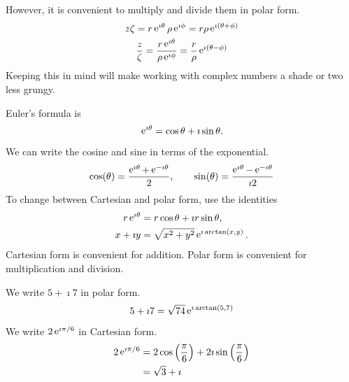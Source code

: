 However, it is convenient to multiply and divide them in polar form.
\begin{gather*}
  z \zeta
  = r \mathop{\mathrm{e}}\nolimits^{\imath \theta} \rho \mathop{\mathrm{e}}\nolimits^{\imath \phi} = r \rho \mathop{\mathrm{e}}\nolimits^{\imath \left( \theta + \phi \right)}
  \\
  \frac{z}{\zeta}
  = \frac{r \mathop{\mathrm{e}}\nolimits^{\imath \theta}}{\rho \mathop{\mathrm{e}}\nolimits^{\imath \phi}}
  = \frac{r}{\rho} \mathop{\mathrm{e}}\nolimits^{\imath \left( \theta - \phi \right)}
\end{gather*}
Keeping this in mind will make working with complex numbers a shade or 
two less grungy.






\begin{Result}
  \label{cartesian_and_polar_form}
  Euler's formula is 
  \[
  \mathop{\mathrm{e}}\nolimits^{\imath \theta} = \cos \theta + \imath \sin \theta.
  \]
  We can write the cosine and sine in terms of the exponential.
  \[
  \cos(\theta) = \frac{\mathop{\mathrm{e}}\nolimits^{\imath \theta} + \mathop{\mathrm{e}}\nolimits^{-\imath \theta}}{2}, 
  \qquad
  \sin(\theta) = \frac{\mathop{\mathrm{e}}\nolimits^{\imath \theta} - \mathop{\mathrm{e}}\nolimits^{-\imath \theta}}{\imath 2}
  \]
  To change between Cartesian and polar form, use the identities
  \begin{align*}
    r \mathop{\mathrm{e}}\nolimits^{\imath \theta} &= r \cos \theta + \imath r \sin \theta, 
    \\
    x + \imath y &= \sqrt{x^2 + y^2} \mathop{\mathrm{e}}\nolimits^{\imath \arctan(x,y)}.
  \end{align*}
  Cartesian form is convenient for addition.  Polar form is convenient 
  for multiplication and division.
\end{Result}







\begin{Example}
  We write $5 + \imath 7$ in polar form.
  \[
  5 + \imath 7 = \sqrt{74} \mathop{\mathrm{e}}\nolimits^{\imath \arctan(5,7) }
  \]
  We write $2 \mathop{\mathrm{e}}\nolimits^{\imath \pi / 6}$ in Cartesian form.
  \begin{align*}
    2 \mathop{\mathrm{e}}\nolimits^{\imath \pi / 6} 
    &= 2 \cos \left( \frac{\pi}{6} \right) 
    + 2 \imath \sin \left( \frac{\pi}{6} \right) 
    \\
    &= \sqrt{3} + \imath
  \end{align*}
\end{Example}








